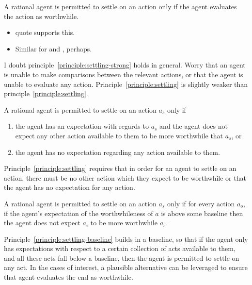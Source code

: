\documentclass[10pt]{article}
\newcommand{\hozlinedash}[0]{%
  \noindent\hdashrule[0.5ex][c]{\textwidth}{.1pt}{2.5pt}
}
\begin{document}
\hozlinedash

\begin{principle}\label{principle:settling-strong}
  A rational agent is permitted to settle on an action only if the agent evaluates the action as worthwhile.
\end{principle}

\begin{itemize}
\item \citeauthor{Davidson:1963aa} quote supports this.
\item Similar for \citeauthor{Anscombe:1957aa} and \citeauthor{Quinn:1993aa}, perhaps.
\end{itemize}

I doubt principle~\ref{principle:settling-strong} holds in general.
Worry that an agent is unable to make comparisons between the relevant actions, or that the agent is unable to evaluate any action.
Principle~\ref{principle:settling} is slightly weaker than principle~\ref{principle:settling}.

\begin{principle}[Settling]\label{principle:settling}
  A rational agent is permitted to settle on an action \(a_{s}\) only if
  \begin{enumerate}
  \item the agent has an expectation with regards to \(a_{s}\) and the agent does not expect any other action available to them to be more worthwhile that \(a_{s}\), or
  \item the agent has no expectation regarding any action available to them.
  \end{enumerate}
\end{principle}

Principle~\ref{principle:settling} requires that in order for an agent to settle on an action, there must be no other action which they expect to be worthwhile or that the agent has no expectation for any action.

\begin{principle}\label{principle:settling-baseline}
  A rational agent is permitted to settle on an action \(a_{s}\) only if for every action \(a_{o}\), if the agent's expectation of the worthwhileness of \(a\) is above some baseline then the agent does not expect \(a_{i}\) to be more worthwhile \(a_{s}\).
\end{principle}

Principle~\ref{principle:settling-baseline} builds in a baseline, so that if the agent only has expectations with respect to a certain collection of acts available to them, and all these acts fall below a baseline, then the agent is permitted to settle on any act.
In the cases of interest, a plausible alternative can be leveraged to ensure that agent evaluates the end as worthwhile.
\end{document}
